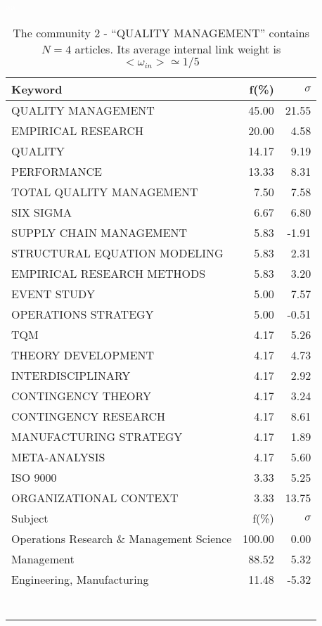 \documentclass[a4paper,11pt]{report}
\begin{document}
\begin{landscape}
\clearpage

\begin{table}[!ht]
\caption{The community 2 - ``QUALITY MANAGEMENT'' contains $N = 4$ articles. Its average internal link weight is $<\omega_{in}> \simeq 1/5$ }
\textcolor{white}{aa}\\
{\scriptsize\begin{tabular}{|l r r|}
\hline
Keyword & f(\%) & $\sigma$\\
\hline
QUALITY MANAGEMENT & 45.00 & 21.55\\
EMPIRICAL RESEARCH & 20.00 & 4.58\\
QUALITY & 14.17 & 9.19\\
PERFORMANCE & 13.33 & 8.31\\
TOTAL QUALITY MANAGEMENT & 7.50 & 7.58\\
SIX SIGMA & 6.67 & 6.80\\
SUPPLY CHAIN MANAGEMENT & 5.83 & -1.91\\
STRUCTURAL EQUATION MODELING & 5.83 & 2.31\\
EMPIRICAL RESEARCH METHODS & 5.83 & 3.20\\
EVENT STUDY & 5.00 & 7.57\\
OPERATIONS STRATEGY & 5.00 & -0.51\\
TQM & 4.17 & 5.26\\
THEORY DEVELOPMENT & 4.17 & 4.73\\
INTERDISCIPLINARY & 4.17 & 2.92\\
CONTINGENCY THEORY & 4.17 & 3.24\\
CONTINGENCY RESEARCH & 4.17 & 8.61\\
MANUFACTURING STRATEGY & 4.17 & 1.89\\
META-ANALYSIS & 4.17 & 5.60\\
ISO 9000 & 3.33 & 5.25\\
ORGANIZATIONAL CONTEXT & 3.33 & 13.75\\
\hline
\hline
Subject & f(\%) & $\sigma$\\
\hline
Operations Research \& Management Science & 100.00 & 0.00\\
Management & 88.52 & 5.32\\
Engineering, Manufacturing & 11.48 & -5.32\\
 &  & \\
 &  & \\
 &  & \\
 &  & \\
 &  & \\
 &  & \\
 &  & \\

\end{tabular}}
\end{table}
\end{landscape}
\end{document}
